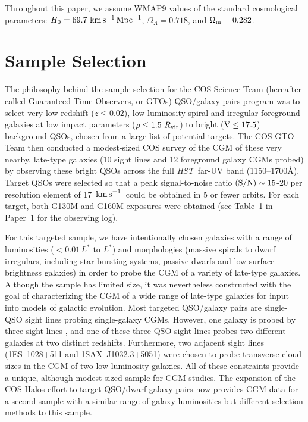 \documentclass[twocolumn,twocolappendix,tighten,times]{aastex6}
\newcommand{\hst}{{\sl HST}}
\newcommand{\kms}{\ensuremath{{\rm km\,s}^{-1}}}
\begin{document}
Throughout this paper, we assume WMAP9 values \citep{hinshaw13} of 
the standard cosmological parameters: $H_0 = 69.7~{\rm km\,s^{-1}\,Mpc^{-1}}$, 
$\Omega_{\Lambda}=0.718$, and $\Omega_{\rm m}=0.282$.





\section{Sample Selection}
\label{sample}

The philosophy behind the sample selection for the COS Science Team (hereafter 
called Guaranteed Time Observers, or GTOs) QSO/galaxy pairs program was to select 
very low-redshift ($z\leq0.02$), low-luminosity spiral and irregular foreground 
galaxies at low impact parameters ($\rho \leq 1.5~R_{\rm vir}$) to bright 
(${\rm V}\leq17.5$) background QSOs, chosen from a large list of potential targets. 
The COS GTO Team then conducted a modest-sized COS survey of the CGM of these very
nearby, late-type galaxies (10 sight lines and 12 foreground galaxy CGMs
probed) by observing these bright QSOs across the full \hst\ far-UV
band (1150--1700\AA). Target QSOs were selected so that a peak signal-to-noise 
ratio ${\rm (S/N)}\sim15$-20 per resolution element of 17~\kms\ could be
obtained in 5 or fewer orbits. For each target, both G130M and G160M
exposures were obtained (see Table~1 in Paper~1 for the observing log). 

For this targeted sample, we have intentionally chosen galaxies with a range of 
luminosities ($<0.01\,L^*$ to $L^*$) and morphologies (massive spirals to dwarf 
irregulars, including star-bursting systems, passive dwarfs and 
low-surface-brightness galaxies) in order to probe the CGM of a variety of 
late-type galaxies. Although the sample has limited size, it was nevertheless 
constructed with the goal of characterizing the CGM of a wide range of late-type 
galaxies for input into models of galactic evolution. Most targeted QSO/galaxy 
pairs are single-QSO sight lines probing single-galaxy CGMs. However, one galaxy is
probed by three sight lines \citep{keeney13}, and one of these three
QSO sight lines probes two different galaxies at two distinct
redshifts. Furthermore, two adjacent sight lines (1ES~1028+511 and 
1SAX~J1032.3+5051) were chosen to probe transverse cloud sizes in the 
CGM of two low-luminosity galaxies. All of these constraints provide a 
unique, although modest-sized sample for CGM studies. The expansion of the 
COS-Halos effort to target QSO/dwarf galaxy pairs
\citep[``COS-Dwarfs'';][]{bordoloi14} now provides CGM data for a
second sample with a similar range of galaxy luminosities but
different selection methods to this sample.
\end{document}
